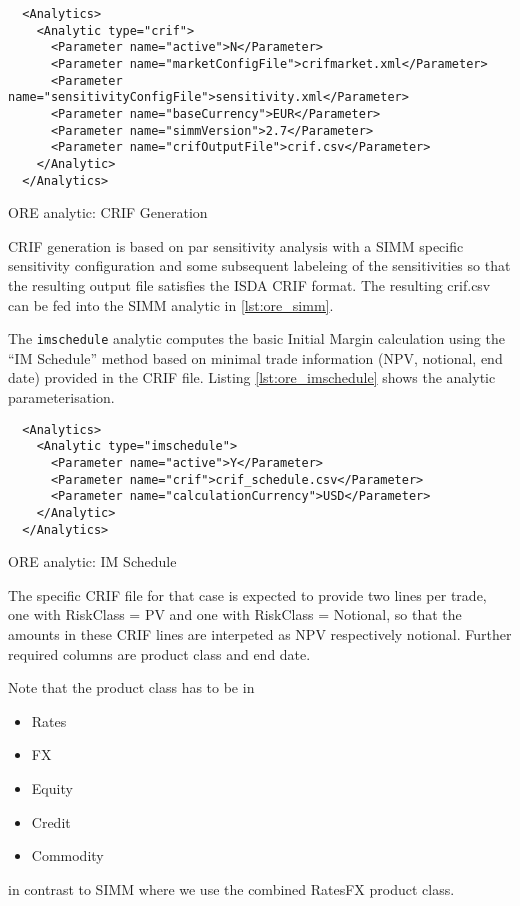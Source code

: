 {\begin{listing}[H]
\begin{verbatim}
  <Analytics>
    <Analytic type="crif">
      <Parameter name="active">N</Parameter>
      <Parameter name="marketConfigFile">crifmarket.xml</Parameter>
      <Parameter name="sensitivityConfigFile">sensitivity.xml</Parameter>
      <Parameter name="baseCurrency">EUR</Parameter>
      <Parameter name="simmVersion">2.7</Parameter>
      <Parameter name="crifOutputFile">crif.csv</Parameter>
    </Analytic>
  </Analytics>
\end{verbatim}
\caption{ORE analytic: CRIF Generation}
\label{lst:ore_crif}
\end{listing}

CRIF generation is based on par sensitivity analysis with a SIMM specific sensitivity configuration
and some subsequent labeleing of the sensitivities so that the resulting output file satisfies the ISDA CRIF format.
The resulting crif.csv can be fed into the SIMM analytic in \ref{lst:ore_simm}.

\medskip
The {\tt imschedule} analytic computes the basic Initial Margin calculation using the ``IM Schedule''
method based on minimal trade information (NPV, notional, end date) provided in the CRIF file.
Listing \ref{lst:ore_imschedule} shows the analytic parameterisation.

\begin{listing}[H]
\begin{verbatim}
  <Analytics>
    <Analytic type="imschedule">
      <Parameter name="active">Y</Parameter>
      <Parameter name="crif">crif_schedule.csv</Parameter>
      <Parameter name="calculationCurrency">USD</Parameter>
    </Analytic>
  </Analytics>
\end{verbatim}
\caption{ORE analytic: IM Schedule}
\label{lst:ore_imschedule}
\end{listing}

The specific CRIF file for that case is expected to provide two lines per trade, one with
RiskClass = PV and one with RiskClass = Notional, so that the amounts in these CRIF lines are
interpeted as NPV respectively notional. Further required columns are product class and end date.

Note that the product class has to be in
\begin{itemize}
\item Rates
\item FX
\item Equity
\item Credit
\item Commodity
\end{itemize}
in contrast to SIMM where we use the combined RatesFX product class.

}
